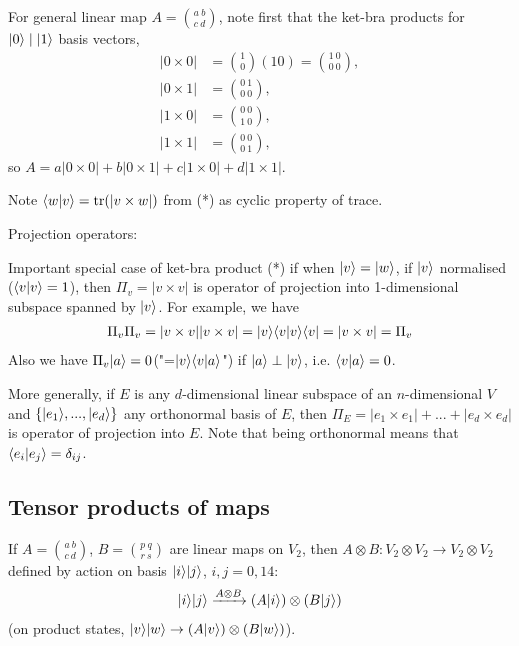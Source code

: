 \documentclass[a4paper]{article}
\begin{document}
For general linear map $A = {{a\ b} \choose {c\ d}}$, note first that the ket-bra products for $|0\rangle \mid |1\rangle$ basis vectors,
\begin{equation*}
\begin{aligned}
|0 \times 0| &= {1 \choose 0}(1 0) = {{1\ 0} \choose {0\ 0}},\\
|0 \times 1| &= {{0\ 1} \choose {0\ 0}},\\
|1 \times 0| &= {{0\ 0} \choose {1\ 0}},\\
|1 \times 1| &= {{0\ 0} \choose {0\ 1}},
\end{aligned}
\end{equation*}
so $A = a|0\times 0| + b|0 \times 1| + c| 1 \times 0| + d| 1 \times 1|$.

Note $\langle w | v \rangle = \operatorname{tr} (|v \times w|)$ from (*) as cyclic property of trace.

Projection operators:

Important special case of ket-bra product (*) if when $|v\rangle = |w\rangle$, if $|v\rangle$ normalised ($\langle v|v \rangle = 1$), then $\Pi_v = |v \times v|$ is operator of projection into 1-dimensional subspace spanned by $|v\rangle$. For example, we have
\begin{equation*}
\begin{aligned}
\Pi_v \Pi_v = |v\times v||v \times v| = |v\rangle\langle v|v\rangle \langle v| = |v\times v| = \Pi_v
\end{aligned}
\end{equation*}
Also we have $\Pi_v |a\rangle = 0$("=$|v\rangle\langle v|a\rangle$") if $|a\rangle \perp |v\rangle$, i.e. $\langle v |a \rangle =0$.

More generally, if $E$ is any $d$-dimensional linear subspace of an $n$-dimensional $V$ and $\{|e_1 \rangle,...,|e_d\rangle\}$ any orthonormal basis of $E$, then $\Pi_E = |e_1 \times e_1 | + ... + |e_d \times e_d|$ is operator of projection into $E$. Note that being orthonormal means that $\langle e_i |e_j \rangle = \delta_{ij}$.

\subsection{Tensor products of maps}
If $A = {{a\ b} \choose {c\ d}}$, $B = {{p\ q} \choose {r\ s}}$ are linear maps on $V_2$, then $A \otimes B: V_2 \otimes V_2 \to V_2 \otimes V_2$ defined by action on basis $|i\rangle |j\rangle$, $i,j=0,14$:
\begin{equation*}
\begin{aligned}
|i\rangle |j\rangle \xrightarrow{A \otimes B} (A|i\rangle) \otimes (B|j\rangle)
\end{aligned}
\end{equation*}
(on product states, $|v\rangle|w\rangle \to (A|v\rangle)\otimes(B|w\rangle)$).
\end{document}
